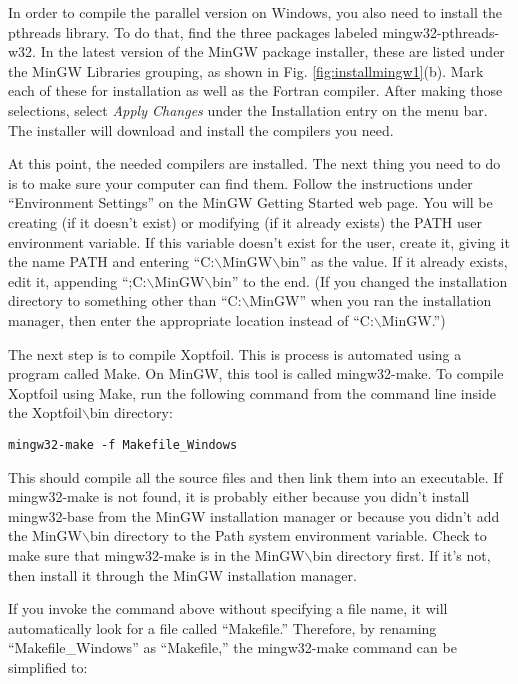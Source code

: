 \documentclass[11pt]{article}
\begin{document}
In order to compile the parallel version on Windows, you also need to install the pthreads
library.  To do that, find the three packages labeled mingw32-pthreads-w32.  In the latest
version of the MinGW package installer, these are listed under the MinGW Libraries
grouping, as shown in Fig. \ref{fig:installmingw1}(b).  Mark each of these for
installation as well as the Fortran compiler. After making those selections, select
\textit{Apply Changes} under the Installation entry on the menu bar.  The installer will 
download and install the compilers you need.

At this point, the needed compilers are installed.  The next thing you need to do is to
make sure your computer can find them.  Follow the instructions under ``Environment
Settings'' on the MinGW Getting Started web page.  You will be creating (if it doesn't
exist) or modifying (if it already exists) the PATH user environment variable.  If this
variable doesn't exist for the user, create it, giving it the name PATH and entering
``C:$\backslash$MinGW$\backslash$bin'' as the value.  If it already exists, edit it,
appending ``;C:$\backslash$MinGW$\backslash$bin'' to the end.  (If you changed the
installation directory to something other than ``C:$\backslash$MinGW'' when you ran the
installation manager, then enter the appropriate location instead of
``C:$\backslash$MinGW.'')

The next step is to compile Xoptfoil. This is process is automated using a program called
Make.  On MinGW, this tool is called mingw32-make.  To compile Xoptfoil using Make, run the
following command from the command line inside the Xoptfoil$\backslash$bin directory:

\begin{verbatim}
mingw32-make -f Makefile_Windows
\end{verbatim}

This should compile all the source files and then link them into an executable.  If
mingw32-make is not found, it is probably either because you didn't install mingw32-base
from the MinGW installation manager or because you didn't add the MinGW$\backslash$bin
directory to the Path system environment variable.  Check to make sure that mingw32-make
is in the MinGW$\backslash$bin directory first.  If it's not, then install it through the
MinGW installation manager.

If you invoke the command above without specifying a file name, it will automatically look
for a file called ``Makefile.''  Therefore, by renaming ``Makefile\_Windows'' as
``Makefile,'' the mingw32-make command can be simplified to:
\end{document}
